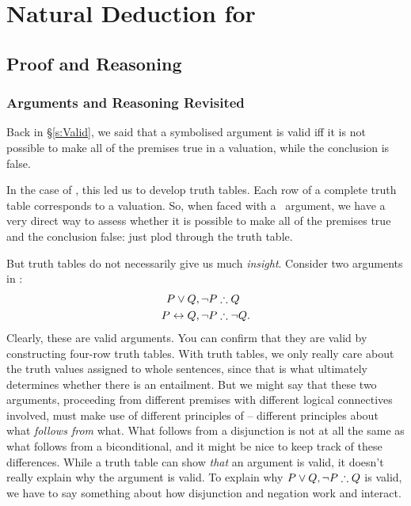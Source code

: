 

\part{Natural Deduction for {\TFL}}
\label{ch.NDTFL}

\chapter{Proof and Reasoning}\label{s:NDVeryIdea}

\section{Arguments and Reasoning Revisited} %
\label{sec:arguments_and_reasoning_revisited}


Back in §\ref{s:Valid}, we said that a symbolised argument is valid iff it is not possible to make all of the premises true in a valuation, while the conclusion is false. 

In the case of \TFL, this led us to develop truth tables. Each row of a complete truth table corresponds to a valuation. So, when faced with a \TFL\ argument, we have a very direct way to assess whether it is possible to make all of the premises true and the conclusion false: just plod through the truth table.

But truth tables do not necessarily give us much \emph{insight}. Consider two arguments in \TFL:
	\begin{align*}
		P \vee Q, \neg P & \mathrel{\therefore} Q\\
		P \leftrightarrow Q, \neg P & \mathrel{\therefore} \neg Q.
	\end{align*}
Clearly, these are valid arguments. You can confirm that they are valid by constructing four-row truth tables. With truth tables, we only really care about the truth values assigned to whole sentences, since that is what ultimately determines whether there is an entailment. But we might say that these two arguments, proceeding from different premises with different logical connectives involved, must make use of different principles of  – different principles about what \emph{follows from} what. What follows from a disjunction is not at all the same as what follows from a biconditional, and it might be nice to keep track of these differences. While a truth table can show \emph{that} an argument is valid, it doesn't really explain why the argument is valid. To explain why $P \vee Q, \neg P \mathrel{\therefore} Q$ is valid, we have to say something about how disjunction and negation work and interact.

